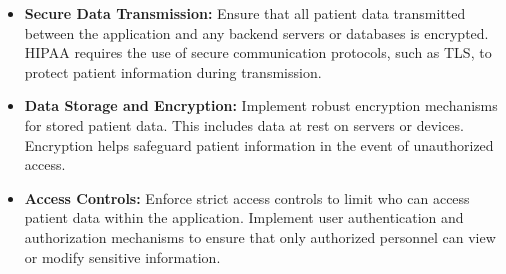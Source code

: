 \begin{itemize}
    \begin{itemize}
        \item \textbf{Secure Data Transmission:} Ensure that all patient data transmitted between the application and any backend servers or databases is encrypted. HIPAA requires the use of secure communication protocols, such as TLS, to protect patient information during transmission.
        \item \textbf{Data Storage and Encryption:} Implement robust encryption mechanisms for stored patient data. This includes data at rest on servers or devices. Encryption helps safeguard patient information in the event of unauthorized access.
        \item \textbf{Access Controls:} Enforce strict access controls to limit who can access patient data within the application. Implement user authentication and authorization mechanisms to ensure that only authorized personnel can view or modify sensitive information.
    \end{itemize}
    
\end{itemize}
